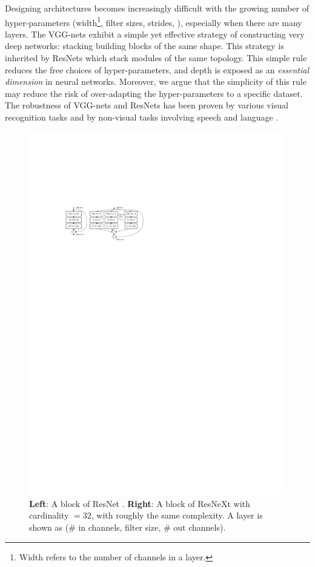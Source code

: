 \documentclass[10pt,twocolumn,letterpaper]{article}
\begin{document}
Designing architectures becomes increasingly difficult with the growing number of hyper-parameters (width\footnote{Width refers to the number of channels in a layer.}, filter sizes, strides, \etc), especially when there are many layers.
The VGG-nets \cite{Simonyan2015} exhibit a simple yet effective strategy of constructing very deep networks: stacking building blocks of the same shape. This strategy is inherited by ResNets \cite{He2016} which stack modules of the same topology.
This simple rule reduces the free choices of hyper-parameters, and depth is exposed as an \emph{essential dimension} in neural networks.
Moreover, we argue that the simplicity of this rule may reduce the risk of over-adapting the hyper-parameters to a specific dataset. The robustness of VGG-nets and ResNets has been proven by various visual recognition tasks \cite{Donahue2014,Girshick2014,Girshick2015,Long2015,Pinheiro2015,He2016} and by non-visual tasks involving speech \cite{Xiong2016,Oord2016} and language \cite{Conneau2016,Wu2016,Kalchbrenner2016}.

\begin{figure}[t]
\centering
\includegraphics[width=1.0\linewidth]{figures/blocks/teaser}
\caption{\textbf{Left}: A block of ResNet \cite{He2016}. \textbf{Right}: A block of ResNeXt with cardinality $=32$, with roughly the same complexity. A layer is shown as (\# in channels, filter size, \# out channels).}
\label{fig:teaser}
\end{figure}
\end{document}
